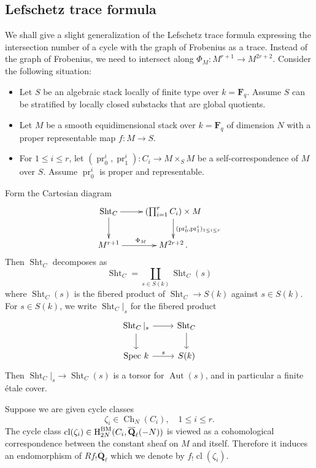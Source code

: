 \documentclass[reqno]{amsart}
\numberwithin{equation}{section}
\newcommand{\F}{\mathbf{F}}
\newcommand{\Q}{\mathbf{Q}}
\DeclareMathOperator{\Aut}{Aut}
\DeclareMathOperator{\Spec}{Spec\,}
\DeclareMathOperator{\Sht}{Sht}
\DeclareMathOperator{\cla}{cl}
\DeclareMathOperator{\pr}{pr}
\DeclareMathOperator{\Ch}{Ch}
\newcommand{\Qlbar}{\overline{\Q}_\ell}
\newcommand{\hBM}[2]{\textup{H}^{\textup{BM}}_{#1}({#2})}  %
\newcommand{\z}{\zeta}
\theoremstyle{remark}
\numberwithin{equation}{section}
\begin{document}
\subsection{Lefschetz trace formula}
We shall give a slight generalization of the Lefschetz trace formula \cite[Proposition A.12]{YZ} expressing the intersection number of a cycle with the graph of Frobenius as a trace. Instead of the graph of Frobenius, we need to intersect along $\Phi_{M}:M^{r+1}\to M^{2r+2}$. Consider the following situation:
\begin{itemize} 
\item Let $S$ be an algebraic stack locally of finite type over $k=\F_q$. Assume $S$ can be stratified by locally closed substacks that are global quotients.
\item Let $M$ be a smooth equidimensional stack over $k=\F_q$ of dimension $N$ with a proper representable map $f: M\to S$. 
\item For $1\le i\le r$,  let $(\pr^{i}_{0},\pr^{i}_{1}): C_{i}\to M\times_{S}M$ be a self-correspondence of $M$ over $S$. Assume $\pr^{i}_{0}$ is proper and representable.
\end{itemize}
Form the Cartesian diagram
\begin{equation}\label{ShtC}
\xymatrix{\Sht_{C} \ar[r]\ar[d] & (\prod_{i=1}^{r}C_{i} ) \times M\ar[d]^{(\pr^{i}_{0}, \pr^{i}_{1})_{1\le i\le r}}\\
M^{r+1}\ar[r]^{\Phi_{M}} & M^{2r+2}\,.}
\end{equation}
Then $\Sht_{C}$ decomposes as
\begin{equation}
\Sht_{C}=\coprod_{s\in S(k)}\Sht_{C}(s)
\end{equation}
where $\Sht_C(s)$ is the fibered product of $\Sht_C \rightarrow S(k)$ against $s \in S(k)$. For $s \in S(k)$, we write $\Sht_{C}|_s$ for the fibered product 
\[
\begin{tikzcd}
\Sht_C|_s \ar[r] \ar[d] & \Sht_C \ar[d] \\
\Spec k \ar[r, "s"] & S(k)
\end{tikzcd}
\]
Then $\Sht_C|_s \rightarrow \Sht_C(s)$ is a torsor for $\Aut(s)$, and in particular a finite \'{e}tale cover. 

Suppose we are given cycle classes
\begin{equation}
\z_{i}\in \Ch_{N}(C_{i}), \quad 1\le i\le r.
\end{equation}
The cycle class  $\cla(\z_{i})\in \hBM{2N}{C_{i},\Qlbar(-N)}$ is viewed as a cohomological correspondence between the constant sheaf on $M$ and itself. Therefore it induces an endomorphism of $Rf_{!}\Qlbar$ which we denote by $f_{!}\cla(\z_{i})$.
\end{document}
